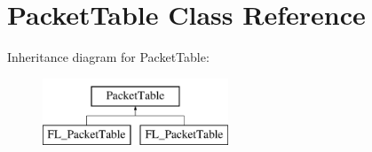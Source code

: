 \hypertarget{class_packet_table}{}\section{Packet\+Table Class Reference}
\label{class_packet_table}
Inheritance diagram for Packet\+Table\+:\begin{figure}[H]
\begin{center}
\leavevmode
\includegraphics[height=2.000000cm]{class_packet_table}
\end{center}
\end{figure}
